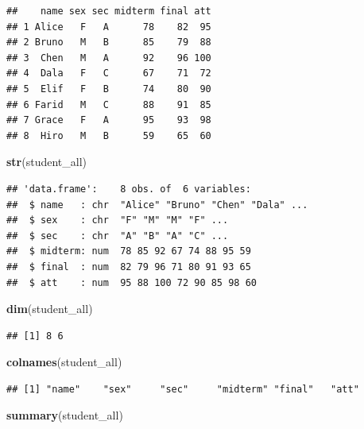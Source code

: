 \documentclass[
]{article}
\newenvironment{Shaded}{\begin{snugshade}}{\end{snugshade}}
\newcommand{\FunctionTok}[1]{\textcolor[rgb]{0.13,0.29,0.53}{\textbf{#1}}}
\newcommand{\NormalTok}[1]{#1}
\begin{document}
\begin{verbatim}
##    name sex sec midterm final att
## 1 Alice   F   A      78    82  95
## 2 Bruno   M   B      85    79  88
## 3  Chen   M   A      92    96 100
## 4  Dala   F   C      67    71  72
## 5  Elif   F   B      74    80  90
## 6 Farid   M   C      88    91  85
## 7 Grace   F   A      95    93  98
## 8  Hiro   M   B      59    65  60
\end{verbatim}

\begin{Shaded}
\begin{Highlighting}[]
\FunctionTok{str}\NormalTok{(student\_all)}
\end{Highlighting}
\end{Shaded}

\begin{verbatim}
## 'data.frame':    8 obs. of  6 variables:
##  $ name   : chr  "Alice" "Bruno" "Chen" "Dala" ...
##  $ sex    : chr  "F" "M" "M" "F" ...
##  $ sec    : chr  "A" "B" "A" "C" ...
##  $ midterm: num  78 85 92 67 74 88 95 59
##  $ final  : num  82 79 96 71 80 91 93 65
##  $ att    : num  95 88 100 72 90 85 98 60
\end{verbatim}

\begin{Shaded}
\begin{Highlighting}[]
\FunctionTok{dim}\NormalTok{(student\_all)}
\end{Highlighting}
\end{Shaded}

\begin{verbatim}
## [1] 8 6
\end{verbatim}

\begin{Shaded}
\begin{Highlighting}[]
\FunctionTok{colnames}\NormalTok{(student\_all)}
\end{Highlighting}
\end{Shaded}

\begin{verbatim}
## [1] "name"    "sex"     "sec"     "midterm" "final"   "att"
\end{verbatim}

\begin{Shaded}
\begin{Highlighting}[]
\FunctionTok{summary}\NormalTok{(student\_all)}
\end{Highlighting}
\end{Shaded}
\end{document}

